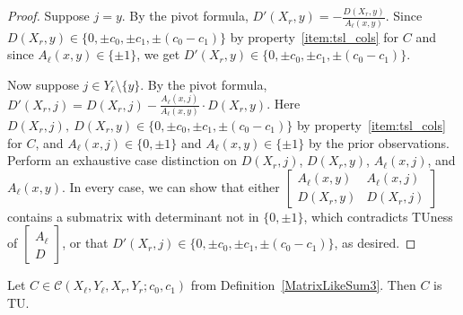 \begin{proof}
    Suppose $j = y$. By the pivot formula, $D' (X_{r}, y) = -\frac{D (X_{r}, y)}{A_{\ell} (x, y)}$. Since $D (X_{r}, y) \in \{0, \pm c_{0}, \pm c_{1}, \pm (c_{0} - c_{1})\}$ by property~\ref{item:tsl_cols} for $C$ and since $A_{\ell} (x, y) \in \{\pm 1\}$, we get $D' (X_{r}, y) \in \{0, \pm c_{0}, \pm c_{1}, \pm (c_{0} - c_{1})\}$.

    Now suppose $j \in Y_{\ell} \setminus \{y\}$. By the pivot formula, $D' (X_{r}, j) = D (X_{r}, j) - \frac{A_{\ell} (x, j)}{A_{\ell} (x, y)} \cdot D (X_{r}, y)$. Here $D (X_{r}, j), \ D (X_{r}, y) \in \{0, \pm c_{0}, \pm c_{1}, \pm (c_{0} - c_{1})\}$ by property~\ref{item:tsl_cols} for $C$, and $A_{\ell} (x, j) \in \{0, \pm 1\}$ and $A_{\ell} (x, y) \in \{\pm 1\}$ by the prior observations. Perform an exhaustive case distinction on $D (X_{r}, j)$, $D (X_{r}, y)$, $A_{\ell} (x, j)$, and $A_{\ell} (x, y)$. In every case, we can show that either $\begin{bmatrix} A_{\ell} (x, y) & A_{\ell} (x, j) \\ D (X_{r}, y) & D (X_{r}, j) \end{bmatrix}$ contains a submatrix with determinant not in $\{0, \pm 1\}$, which contradicts TUness of $\begin{bmatrix} A_{\ell} \\ D \end{bmatrix}$, or that $D' (X_{r}, j) \in \{0, \pm c_{0}, \pm c_{1}, \pm (c_{0} - c_{1})\}$, as desired. 
\end{proof}

\begin{lemma}
    \label{MatrixLikeSum3.IsTotallyUnimodular}
    \leanok
    Let $C \in \mathcal{C} (X_{\ell}, Y_{\ell}, X_{r}, Y_{r}; c_{0}, c_{1})$ from Definition~\ref{MatrixLikeSum3}. Then $C$ is TU.
\end{lemma}


